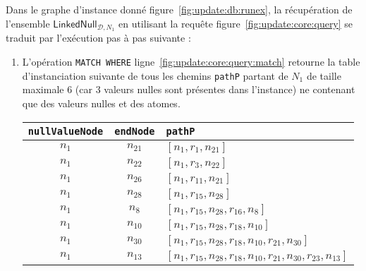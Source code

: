 \begin{example}
	Dans le graphe d'instance donné figure~\ref{fig:update:db:runex}, la récupération de l'ensemble $\textsf{LinkedNull}_{\mathcal{D}, N_1}$ en utilisant la requête figure~\ref{fig:update:core:query} se traduit par l'exécution pas à pas suivante :
	\begin{enumerate}[label=\emph{Etape~\arabic*},leftmargin=*]
		\item L'opération \verb|MATCH WHERE| ligne~\ref{fig:update:core:query:match} retourne la table d'instanciation suivante de tous les chemins \verb|pathP| partant de $N_1$ de taille maximale 6 (car 3 valeurs nulles sont présentes dans l'instance) ne contenant que des valeurs nulles et des atomes.
		      \begin{center}
			      \begin{tabular}{ccl}
				      \hline
				      \verb|nullValueNode| & \verb|endNode| & \verb|pathP|                                                              \\
				      \hline
				      $n_{1}$              & $n_{21}$       & $[n_{1}, r_{1}, n_{21}]$                                                  \\
				      $n_{1}$              & $n_{22}$       & $[n_{1}, r_{3}, n_{22}]$                                                  \\
				      $n_{1}$              & $n_{26}$       & $[n_{1}, r_{11}, n_{21}]$                                                 \\
				      $n_{1}$              & $n_{28}$       & $[n_{1}, r_{15}, n_{28}]$                                                 \\
				      $n_{1}$              & $n_{8}$        & $[n_{1}, r_{15}, n_{28}, r_{16}, n_{8}]$                                  \\
				      $n_{1}$              & $n_{10}$       & $[n_{1}, r_{15}, n_{28}, r_{18}, n_{10}]$                                 \\
				      $n_{1}$              & $n_{30}$       & $[n_{1}, r_{15}, n_{28}, r_{18}, n_{10}, r_{21}, n_{30}]$                 \\
				      $n_{1}$              & $n_{13}$       & $[n_{1}, r_{15}, n_{28}, r_{18}, n_{10}, r_{21}, n_{30}, r_{23}, n_{13}]$ \\
				      \hline
			      \end{tabular}
		      \end{center}


\end{enumerate}
\end{example}

